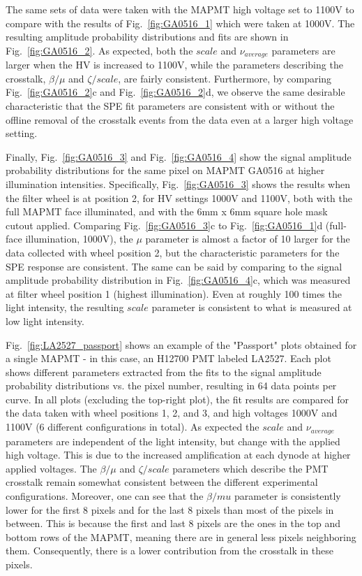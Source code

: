 The same sets of data were taken with the MAPMT high voltage set to 1100V to compare with the results of Fig.~\ref{fig:GA0516_1} which were taken at 1000V. 
The resulting amplitude probability distributions and fits are shown in Fig.~\ref{fig:GA0516_2}. 
As expected, both the $scale$ and $\nu_{average}$ parameters are larger when the HV is increased to 1100V, while the parameters describing the crosstalk, $\beta/\mu$ and $\zeta/scale$, are fairly consistent. 
Furthermore, by comparing Fig.~\ref{fig:GA0516_2}c and Fig.~\ref{fig:GA0516_2}d, we observe the same desirable characteristic that the SPE fit parameters are consistent with or without the offline removal of the crosstalk events from the data even at a larger high voltage setting.


Finally, Fig.~\ref{fig:GA0516_3} and Fig.~\ref{fig:GA0516_4} show the signal amplitude probability distributions for the same pixel on MAPMT GA0516 at higher illumination intensities. 
Specifically, Fig.~\ref{fig:GA0516_3} shows the results when the filter wheel is at position 2, for HV settings 1000V and 1100V, both with the full MAPMT face illuminated, and with the 6mm x 6mm square hole mask cutout applied. 
Comparing Fig.~\ref{fig:GA0516_3}c to Fig.~\ref{fig:GA0516_1}d (full-face illumination, 1000V), the $\mu$ parameter is almost a factor of 10 larger for the data collected with wheel position 2, but the characteristic parameters for the SPE response are consistent. 
The same can be said by comparing to the signal amplitude probability distribution in Fig.~\ref{fig:GA0516_4}c, which was measured at filter wheel position 1 (highest illumination). 
Even at roughly 100 times the light intensity, the resulting $scale$ parameter is consistent to what is measured at low light intensity. 

Fig.~\ref{fig:LA2527_passport} shows an example of the "Passport" plots obtained for a single MAPMT - in this case, an H12700 PMT labeled LA2527. 
Each plot shows different parameters extracted from the fits to the signal amplitude probability distributions vs. the pixel number, resulting in 64 data points per curve.
In all plots (excluding the top-right plot), the fit results are compared for the data taken with wheel positions 1, 2, and 3, and high voltages 1000V and 1100V (6 different configurations in total).
As expected the $scale$ and $\nu_{average}$ parameters are independent of the light intensity, but change with the applied high voltage. 
This is due to the increased amplification at each dynode at higher applied voltages.
The $\beta/\mu$ and $\zeta/scale$ parameters which describe the PMT crosstalk remain somewhat consistent between the different experimental configurations. 
Moreover, one can see that the $\beta/mu$ parameter is consistently lower for the first 8 pixels and for the last 8 pixels than most of the pixels in between.
This is because the first and last 8 pixels are the ones in the top and bottom rows of the MAPMT, meaning there are in general less pixels neighboring them.
Consequently, there is a lower contribution from the crosstalk in these pixels.

